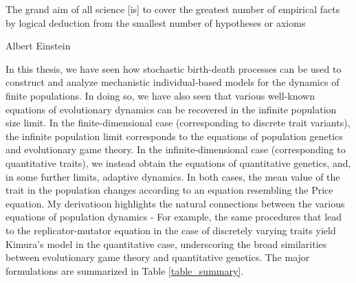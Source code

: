 \epigraph{\justifying The grand aim of all science [is] to cover the greatest number of empirical facts by logical deduction from the smallest number of hypotheses or axioms}{Albert Einstein}
\justifying
In this thesis, we have seen how stochastic birth-death processes can be used to construct and analyze mechanistic individual-based models for the dynamics of finite populations. In doing so, we have also seen that various well-known equations of evolutionary dynamics can be recovered in the infinite population size limit. In the finite-dimensional case (corresponding to discrete trait variants), the infinite population limit corresponds to the equations of population genetics and evolutionary game theory. In the infinite-dimensional case (corresponding to quantitative traits), we instead obtain the equations of quantitative genetics, and, in some further limits, adaptive dynamics. In both cases, the mean value of the trait in the population changes according to an equation resembling the Price equation. My derivatioon highlights the natural connections between the various equations of population dynamics - For example, the same procedures that lead to the replicator-mutator equation in the case of discretely varying traits yield Kimura's model in the quantitative case, underscoring the broad similarities between evolutionary game theory and quantitative genetics. The major formulations are summarized in Table \ref{table_summary}.

